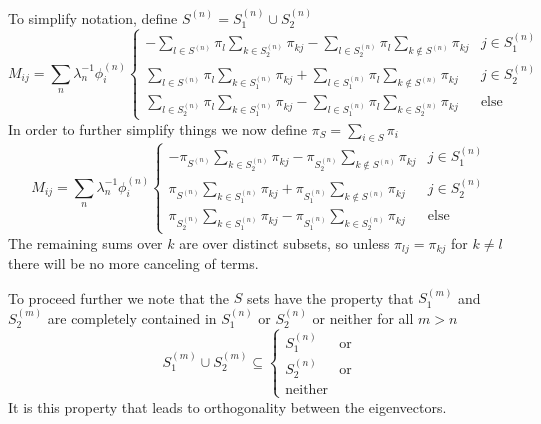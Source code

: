 \documentclass[a4paper]{article}
\newcommand{\evec}[2]{\phi^{(#2)}_{#1}}
\begin{document}
To simplify notation, define $S^{(n)} = S_1^{(n)} \cup S_2^{(n)}$
\begin{equation}
M_{ij} = \sum_n \lambda_n^{-1} \evec{i}{n} 
\begin{cases}
-\sum_{l \in S^{(n)}} \pi_l
\sum_{k \in S_2^{(n)}}  \pi_{kj}
-\sum_{l \in S_2^{(n)}} \pi_l
\sum_{k \notin S^{(n)}} \pi_{kj}
 & j \in S_1^{(n)} \\
\sum_{l \in S^{(n)}} \pi_l
\sum_{k \in S_1^{(n)}}  \pi_{kj}
+ \sum_{l \in S_1^{(n)}} \pi_l
\sum_{k \notin S^{(n)}} \pi_{kj}
& j \in S_2^{(n)} \\
\sum_{l \in S_2^{(n)}} \pi_l \sum_{k \in S_1^{(n)}}  \pi_{kj}
- 
\sum_{l \in S_1^{(n)}} \pi_l \sum_{k \in S_2^{(n)}}  \pi_{kj}
& \text{else}
\end{cases}
\end{equation}
In order to further simplify things we now define $\pi_{S} = \sum_{i \in S} \pi_i$
\begin{equation}
M_{ij} = \sum_n \lambda_n^{-1} \evec{i}{n} 
\begin{cases}
-\pi_{S^{(n)}}
\sum_{k \in S_2^{(n)}}  \pi_{kj}
-\pi_{S_2^{(n)}}
\sum_{k \notin S^{(n)}} \pi_{kj}
 & j \in S_1^{(n)} \\
\pi_{S^{(n)}}
\sum_{k \in S_1^{(n)}}  \pi_{kj}
+ \pi_{S_1^{(n)}}
\sum_{k \notin S^{(n)}} \pi_{kj}
& j \in S_2^{(n)} \\
\pi_{S_2^{(n)}} \sum_{k \in S_1^{(n)}}  \pi_{kj}
- 
\pi_{S_1^{(n)}} \sum_{k \in S_2^{(n)}}  \pi_{kj}
& \text{else}
\end{cases}
\end{equation}
The remaining sums over $k$ are over distinct subsets, so unless $\pi_{lj} = \pi_{kj}$ for $k\ne l$ there will be no more canceling of terms.

To proceed further we note that the $S$ sets have the property that $S_1^{(m)}$ and  $S_2^{(m)}$ are completely contained
in $S_1^{(n)}$ or $S_2^{(n)}$ or neither for all $m > n$
\begin{equation}
S_1^{(m)} \cup S_2^{(m)} \subseteq 
\begin{cases}
S_1^{(n)} & \text{or} \\
S_2^{(n)} & \text{or} \\
\text{neither} & {}
\end{cases}
\end{equation}
It is this property that leads to orthogonality between the eigenvectors.
\end{document}
